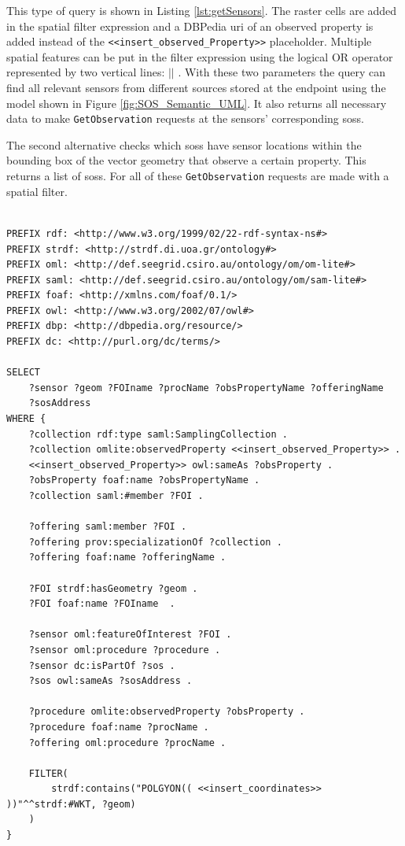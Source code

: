 This type of query is shown in Listing \ref{lst:getSensors}. The raster cells are added in the spatial filter expression and a DBPedia \ac{uri} of an observed property is added instead of the \texttt{<<insert\_observed\_Property>>} placeholder. Multiple spatial features can be put in the filter expression using the logical OR operator represented by two vertical lines: $||$ . With these two parameters the query can find all relevant sensors from different sources stored at the endpoint using the model shown in Figure \ref{fig:SOS_Semantic_UML}. It also returns all necessary data to make \texttt{GetObservation} requests at the sensors' corresponding \aclp{sos}.

The second alternative checks which \aclp{sos} have sensor locations within the bounding box of the vector geometry that observe a certain property. This returns a list of \aclp{sos}. For all of these \texttt{GetObservation} requests are made with a spatial filter. 

\begin{lstlisting}[float,caption={A spatial SPARQL query for discovering sensors and their SOS related metadata}, label={lst:getSensors}]

PREFIX rdf: <http://www.w3.org/1999/02/22-rdf-syntax-ns#>
PREFIX strdf: <http://strdf.di.uoa.gr/ontology#>
PREFIX oml: <http://def.seegrid.csiro.au/ontology/om/om-lite#>
PREFIX saml: <http://def.seegrid.csiro.au/ontology/om/sam-lite#>
PREFIX foaf: <http://xmlns.com/foaf/0.1/>
PREFIX owl: <http://www.w3.org/2002/07/owl#>
PREFIX dbp: <http://dbpedia.org/resource/>
PREFIX dc: <http://purl.org/dc/terms/>

SELECT 
	?sensor ?geom ?FOIname ?procName ?obsPropertyName ?offeringName 
	?sosAddress
WHERE {
	?collection rdf:type saml:SamplingCollection .
	?collection omlite:observedProperty <<insert_observed_Property>> .
	<<insert_observed_Property>> owl:sameAs ?obsProperty .
	?obsProperty foaf:name ?obsPropertyName .
	?collection saml:#member ?FOI .
	
	?offering saml:member ?FOI . 
	?offering prov:specializationOf ?collection .
	?offering foaf:name ?offeringName .
	
	?FOI strdf:hasGeometry ?geom . 
	?FOI foaf:name ?FOIname  .
	
	?sensor oml:featureOfInterest ?FOI .
	?sensor oml:procedure ?procedure .
	?sensor dc:isPartOf ?sos .
	?sos owl:sameAs ?sosAddress .
	
	?procedure omlite:observedProperty ?obsProperty .
	?procedure foaf:name ?procName .
	?offering oml:procedure ?procName .
	
	FILTER(
		strdf:contains("POLGYON(( <<insert_coordinates>> ))"^^strdf:#WKT, ?geom)
	)		
}
\end{lstlisting}


